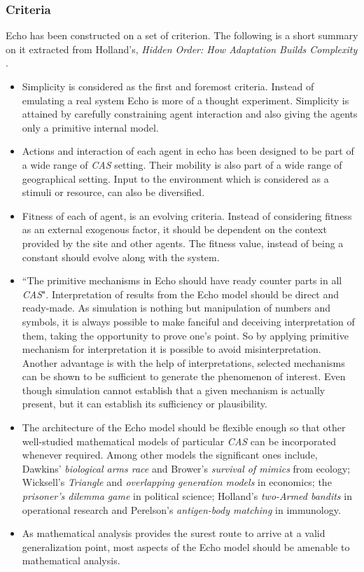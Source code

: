 \subsubsection{Criteria}
Echo has been constructed on a set of criterion. The following is a short summary on it extracted from Holland's, \textsl{Hidden Order: How Adaptation Builds Complexity} \cite{holland1996}.

\begin{itemize}
	\item Simplicity is considered as the first and foremost criteria. Instead of emulating a real system Echo is more of a thought experiment. Simplicity is attained by carefully constraining agent interaction and also giving the agents only a primitive internal model. 
	\item Actions and interaction of each agent in echo has been designed to be part of a wide range of \textsl{CAS} setting. Their mobility is also part of a wide range of geographical setting. Input to the environment which is considered as a stimuli or resource, can also be diversified.
	\item Fitness of each of agent, is an evolving criteria. Instead of considering fitness as an external exogenous factor, it should be dependent on the context provided by the site and other agents. The fitness value, instead of being a constant should evolve along with the system. 
	\item ``The primitive mechanisms in Echo should have ready counter parts in all \textsl{CAS}". Interpretation of results from the Echo model should be direct and ready-made. As simulation is nothing but manipulation of numbers and symbols, it is always possible to make fanciful and deceiving interpretation of them, taking the opportunity to prove one's point. So by applying primitive mechanism for interpretation it is possible to avoid misinterpretation. Another advantage is with the help of interpretations, selected mechanisms can be shown to be sufficient to generate the phenomenon of interest. Even though simulation cannot establish that a given mechanism is actually present, but it can establish its sufficiency or plausibility.
	\item The architecture of the Echo model should be flexible enough so that other well-studied mathematical models of particular \textsl{CAS} can be incorporated whenever required. Among other models the significant ones include, Dawkins' \textsl{biological arms race} \cite{dawkins1990} and Brower's \textsl{survival of mimics} \cite{brower1988} from ecology; Wicksell's \textsl{Triangle} \cite{marimon1989} and \textsl{overlapping generation models} \cite{anderson1989} in economics; the \textsl{prisoner's dilemma game} \cite{axelrod1984} in political science; Holland's \textsl{two-Armed bandits} \cite{holland1975} in operational research and Perelson's \textsl{antigen-body matching} \cite{perelson1999} in immunology. 
	\item As mathematical analysis provides the surest route to arrive at a valid generalization point, most aspects of the Echo model should be amenable to mathematical analysis. 
\end{itemize}

